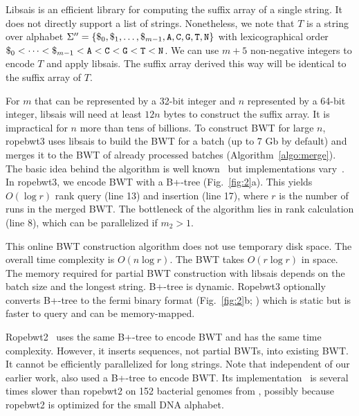 \documentclass[webpdf,contemporary,large,namedate]{oup-authoring-template}%
\begin{document}
Libsais is an efficient library for computing the suffix array of a single string.
It does not directly support a list of strings.
Nonetheless, we note that $T$ is a string over alphabet $\Sigma''=\{\$_0,\$_1,\ldots,\$_{m-1},{\tt A},{\tt C},{\tt G},{\tt T},{\tt N}\}$
with lexicographical order $\$_0<\cdots<\$_{m-1}<{\tt A}<{\tt C}<{\tt G}<{\tt T}<{\tt N}$.
We can use $m+5$ non-negative integers to encode $T$ and apply libsais.
The suffix array derived this way will be identical to the suffix array of $T$.

For $m$ that can be represented by a 32-bit integer and $n$ represented by a 64-bit integer,
libsais will need at least $12n$ bytes to construct the suffix array.
It is impractical for $n$ more than tens of billions.
To construct BWT for large $n$, ropebwt3 uses libsais to build the BWT for a batch (up to 7 Gb by default)
and merges it to the BWT of already processed batches (Algorithm~\ref{algo:merge}).
The basic idea behind the algorithm is well known~\citep{DBLP:conf/latin/FerraginaGM10}
but implementations vary~\citep{DBLP:conf/dcc/Siren16,DBLP:conf/dcc/Oliva0SMKGB21}.
In ropebwt3, we encode BWT with a B+-tree (Fig.~\ref{fig:2}a).
This yields $O(\log r)$ rank query (line 13) and insertion (line 17), where $r$ is the number of runs in the merged BWT.
The bottleneck of the algorithm lies in rank calculation (line 8), which can be parallelized if $m_2>1$.

This online BWT construction algorithm does not use temporary disk space.
The overall time complexity is $O(n\log r)$.
The BWT takes $O(r\log r)$ in space.
The memory required for partial BWT construction with libsais depends on the batch size and the longest string.
B+-tree is dynamic.
Ropebwt3 optionally converts B+-tree to the fermi binary format (Fig.~\ref{fig:2}b; \citealt*{Li:2012fk})
which is static but is faster to query and can be memory-mapped.

Ropebwt2~\citep{Li:2014ab} uses the same B+-tree to encode BWT and has the same time complexity.
However, it inserts sequences, not partial BWTs, into existing BWT.
It cannot be efficiently parallelized for long strings.
Note that independent of our earlier work, \citet{DBLP:journals/jda/OhnoSTIS18} also used a B+-tree to encode BWT.
Its implementation~\citep{DBLP:journals/tcs/BannaiGI20} is several times slower than ropebwt2 on 152 bacterial genomes from \citet{Li:2024ab},
possibly because ropebwt2 is optimized for the small DNA alphabet.
\end{document}
